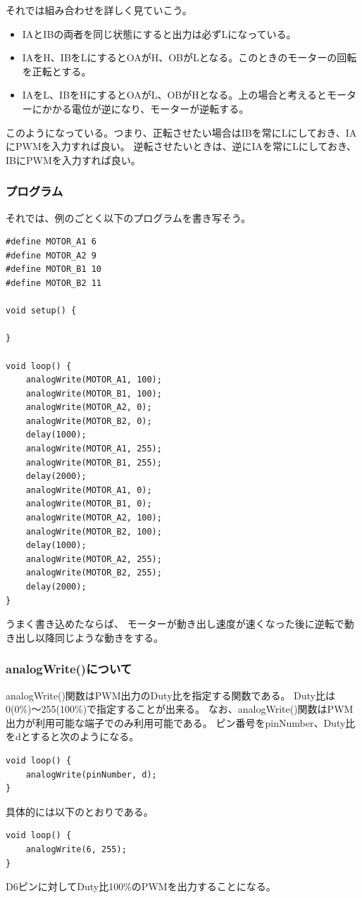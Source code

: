 \documentclass[uplatex]{jsarticle}
\begin{document}
それでは組み合わせを詳しく見ていこう。
\begin{itemize}
    \item IAとIBの両者を同じ状態にすると出力は必ずLになっている。
    \item IAをH、IBをLにするとOAがH、OBがLとなる。このときのモーターの回転を正転とする。
    \item IAをL、IBをHにするとOAがL、OBがHとなる。上の場合と考えるとモーターにかかる電位が逆になり、モーターが逆転する。
\end{itemize}
このようになっている。つまり、正転させたい場合はIBを常にLにしておき、IAにPWMを入力すれば良い。
逆転させたいときは、逆にIAを常にLにしておき、IBにPWMを入力すれば良い。
\subsubsection{プログラム}
それでは、例のごとく以下のプログラムを書き写そう。
\begin{lstlisting}[basicstyle=\ttfamily\footnotesize, frame=single]
#define MOTOR_A1 6
#define MOTOR_A2 9
#define MOTOR_B1 10
#define MOTOR_B2 11

void setup() {

}
    
void loop() {
    analogWrite(MOTOR_A1, 100);
    analogWrite(MOTOR_B1, 100);
    analogWrite(MOTOR_A2, 0);
    analogWrite(MOTOR_B2, 0);
    delay(1000);
    analogWrite(MOTOR_A1, 255);
    analogWrite(MOTOR_B1, 255);
    delay(2000);
    analogWrite(MOTOR_A1, 0);
    analogWrite(MOTOR_B1, 0);
    analogWrite(MOTOR_A2, 100);
    analogWrite(MOTOR_B2, 100);
    delay(1000);
    analogWrite(MOTOR_A2, 255);
    analogWrite(MOTOR_B2, 255);
    delay(2000);
}
\end{lstlisting}
うまく書き込めたならば、
モーターが動き出し速度が速くなった後に逆転で動き出し以降同じような動きをする。
\subsubsection{analogWrite()について}
analogWrite()関数はPWM出力のDuty比を指定する関数である。
Duty比は0(0\%)〜255(100\%)で指定することが出来る。
なお、analogWrite()関数はPWM出力が利用可能な端子でのみ利用可能である。
ピン番号をpinNumber、Duty比をdとすると次のようになる。
\begin{lstlisting}[basicstyle=\ttfamily\footnotesize, frame=single]
void loop() {
    analogWrite(pinNumber, d);
}
\end{lstlisting}
具体的には以下のとおりである。
\begin{lstlisting}[basicstyle=\ttfamily\footnotesize, frame=single]
void loop() {
    analogWrite(6, 255);
}
\end{lstlisting}
D6ピンに対してDuty比100\%のPWMを出力することになる。
\end{document}
